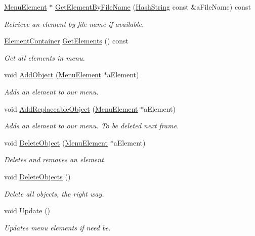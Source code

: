 \begin{DoxyCompactItemize}
\hyperlink{classMenuElement}{Menu\+Element} $\ast$ \hyperlink{classMenu_ac295be5c0476f3618793cdd122457ca3}{Get\+Element\+By\+File\+Name} (\hyperlink{classHashString}{Hash\+String} const \&a\+File\+Name) const 
\begin{DoxyCompactList}\small\item\em Retrieve an element by file name if available. \end{DoxyCompactList}\item 
\hyperlink{classMenu_af1e1ac12e9eab661af646964b15edf54}{Element\+Container} \hyperlink{classMenu_a05f16b98a943adbe9a554013faa9b4bd}{Get\+Elements} () const 
\begin{DoxyCompactList}\small\item\em Get all elements in menu. \end{DoxyCompactList}\item 
void \hyperlink{classMenu_a1ed1a69cbb40c0886c7e9c1ed86de956}{Add\+Object} (\hyperlink{classMenuElement}{Menu\+Element} $\ast$a\+Element)
\begin{DoxyCompactList}\small\item\em Adds an element to our menu. \end{DoxyCompactList}\item 
void \hyperlink{classMenu_a2c7f8f61cec125bc31e9fc46999e4a4b}{Add\+Replaceable\+Object} (\hyperlink{classMenuElement}{Menu\+Element} $\ast$a\+Element)
\begin{DoxyCompactList}\small\item\em Adds an element to our menu. To be deleted next frame. \end{DoxyCompactList}\item 
void \hyperlink{classMenu_a771ca8f1966314a8d8f28c1479c5c9c7}{Delete\+Object} (\hyperlink{classMenuElement}{Menu\+Element} $\ast$a\+Element)
\begin{DoxyCompactList}\small\item\em Deletes and removes an element. \end{DoxyCompactList}\item 
void \hyperlink{classMenu_a2f4d80db5a03120666992e3d8e73cb2a}{Delete\+Objects} ()
\begin{DoxyCompactList}\small\item\em Delete all objects, the right way. \end{DoxyCompactList}\item 
void \hyperlink{classMenu_af29d71473a414e31e914bc637840cb3e}{Update} ()
\begin{DoxyCompactList}\small\item\em Updates menu elements if need be. \end{DoxyCompactList}\item 

\end{DoxyCompactItemize}
